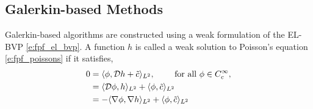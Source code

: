 \subsection{Galerkin-based Methods} 
\label{s:galerkin}
Galerkin-based algorithms are constructed using a weak formulation of the EL-BVP \eqref{e:fpf_el_bvp}. A function $h$ is called a weak solution to Poisson's equation \eqref{e:fpf_poissons} if it satisfies,
\begin{equation}
\begin{aligned}
0 & = \langle \phi, \generate h + \tilc \rangle_{L^2}, \qquad \text{ for all } \phi \in C_c^\infty, \\
& = \langle \generate \phi, h \rangle_{L^2} + \langle \phi, \tilc \rangle_{L^2} \\ 
& = - \langle \nabla \phi, \nabla h \rangle_{L^2} + \langle \phi, \tilc \rangle_{L^2}
\end{aligned}
\label{e:fpf_galerkin}
\end{equation}

